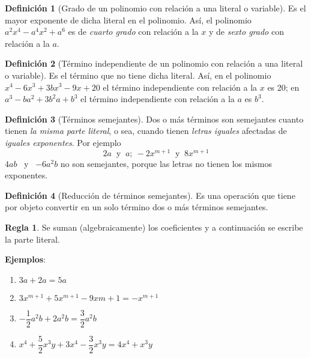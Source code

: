 \documentclass[12pt,letterpaper]{article}
\theoremstyle{definition}
\newtheorem{defn}{Definición}
\newtheorem{reg}{Regla}
\begin{document}
\begin{defn}[Grado de un polinomio con relación a una literal o variable]
Es el mayor exponente de dicha literal en el polinomio. Así, el polinomio $a^2x^4-a^4x^2+a^6$ es de \emph{cuarto grado} con relación a la $x$ y de \emph{sexto grado} con relación a la $a$.
\end{defn}

\begin{defn}[Término independiente de un polinomio con relación a una literal o variable] %
Es el término que no tiene dicha literal. Así, en el polinomio\\
$x^4-6x^3+3bx^3-9x+20$ el término independiente con relación a la $x$ es 20; en $a^3-ba^2+3b^2a+b^3$ el término independiente con relación a la $a$ es $b^3$.
\end{defn}

\smallskip

\begin{defn}[Términos semejantes] %
Dos o más términos son semejantes cuanto tienen \emph{la misma parte literal}, o sea, cuando tienen \emph{letras iguales} afectadas de \emph{iguales exponentes}. Por ejemplo\\
\begin{equation*}
2a \ \text{ y } \ a; \ -2x^{m+1} \ \text{ y } \ 8x^{m+1}
\end{equation*}
$4ab$ \ y \ $-6a^2b$ no son semejantes, porque las letras no tienen los mismos exponentes.
\end{defn}

\begin{defn}[Reducción de términos semejantes] %
Es una operación que tiene por objeto convertir en un solo término dos o más términos semejantes.
\end{defn}

\begin{reg} Se suman (algebraicamente) los coeficientes y a continuación se escribe la parte literal.
\end{reg}

\textbf{Ejemplos}:
\begin{multicols}{2}
\begin{enumerate}
\item $3a+2a=5a$
\item $3x^{m+1}+5x^{m+1}-9x{m+1}=-x^{m+1}$
\item $-\dfrac{1}{2}a^2b+2a^2b=\dfrac{3}{2}a^2b$
\item $x^4+\dfrac{5}{2}x^3y+3x^4-\dfrac{3}{2}x^3y=4x^4+x^3y$
\end{enumerate}
\end{multicols}
\end{document}
